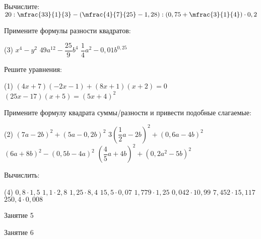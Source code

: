 \begin{homework}[number=2]
	\begin{listofex}
		\item Вычислите: \( 20 : \mfrac{33}{1}{3} - \left( \mfrac{4}{7}{25} - 1,28 \right) : \left( 0,75 + \mfrac{3}{1}{4} \right) \cdot 0,2 \)
		\item Примените формулы разности квадратов:
		\begin{tasks}(3)
			\task \( x^4-y^2 \)
			\task \( 49a^{12}-\dfrac{25}{9}b^4 \)
			\task \( \dfrac{1}{4}a^2-0,01b^{0,25} \)
		\end{tasks}
		\item Решите уравнения: 
		\begin{tasks}(1)
			\task \( (4x+7)(-2x-1)+(8x+1)(x+2)=0 \)
			\task \( (25x-17)(x+5)=(5x+4)^2 \)
		\end{tasks}
		\item Примените формулу квадрата суммы/разности и привести подобные слагаемые:
		\begin{tasks}(2)
			\task \( (7a-2b)^2+(5a-0,2b)^2 \)
			\task \( 3\left(\dfrac{1}{2}a-2b\right)^2+(0,6a-4b)^2 \)
			\task \( (6a+8b)^2 - (0,5b-4a)^2 \)
			\task \( \left(\dfrac{4}{5}a+4b \right)^2+(0,2a^2-5b)^2 \)
		\end{tasks}
		\item Вычислить:
		\begin{tasks}(4)
			\task \( 0,8 \cdot 1,5 \)
			\task \( 1,1 \cdot 2,8 \)
			\task \( 1,25 \cdot 8,4 \)
			\task \( 15,5 \cdot 0,07 \)
			\task \( 1,779 \cdot 1,25 \)
			\task \( 0,042 \cdot 10,99 \)
			\task \( 7,452 \cdot 15,117 \)
			\task \( 250,4 \cdot 0,008 \)
		\end{tasks}
	\end{listofex}
\end{homework}

\begin{class}[number=5]
	\begin{listofex}
		\item Занятие 5
	\end{listofex}
\end{class}

\begin{class}[number=6]
	\begin{listofex}
		\item Занятие 6
	\end{listofex}
\end{class}

